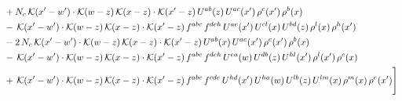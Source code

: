 \documentclass[9pt]{article}
\numberwithin{equation}{section}
\begin{document}
\begin{align}
&+N_{c}\,\mathcal{K}(x'-w')\cdot\mathcal{K}(w-z)\,\mathcal{K}(x-z)\cdot\mathcal{K}(x'-z)\,U^{ab}(z)\,U^{ac}(x')\,\rho^{c}(x')\,\rho^{b}(x)\notag \\ 
&-\,\mathcal{K}(x'-w')\cdot\mathcal{K}(w-z)\,\mathcal{K}(x-z)\cdot\mathcal{K}(x'-z)\,f^{abc}\,f^{deh}\,U^{ae}(x')\,U^{cl}(x)\,U^{bd}(z)\,\rho^{l}(x)\,\rho^{h}(x')\notag \\ 
&-2\,N_{c}\,\mathcal{K}(x'-w')\cdot\mathcal{K}(w-z)\,\mathcal{K}(x-z)\cdot\mathcal{K}(x'-z)\,U^{ab}(x)\,U^{ac}(x')\,\rho^{c}(x')\,\rho^{b}(x)\notag \\ 
&-\,\mathcal{K}(x'-w')\cdot\mathcal{K}(w-z)\,\mathcal{K}(x-z)\cdot\mathcal{K}(x'-z)\,f^{abc}\,f^{deh}\,U^{ea}(w)\,U^{db}(z)\,U^{hl}(x')\,\rho^{l}(x')\,\rho^{c}(x)\notag \\ 
&+\,\mathcal{K}(x'-w')\cdot\mathcal{K}(w-z)\,\mathcal{K}(x-z)\cdot\mathcal{K}(x'-z)\,f^{abc}\,f^{cde}\,U^{hd}(x')\,U^{ha}(w)\,U^{lb}(z)\,U^{lm}(x)\,\rho^{m}(x)\,\rho^{e}(x')\Bigg]
\end{align}
\end{document}
